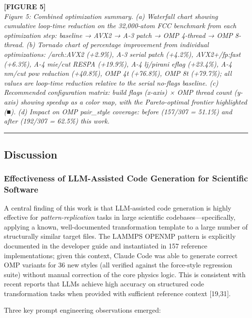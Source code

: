 \documentclass[
  11pt,
]{article}
\begin{document}
\textbf{{[}FIGURE 5{]}}\\
\emph{Figure 5: Combined optimization summary. (a) Waterfall chart
showing cumulative loop-time reduction on the 32,000-atom FCC benchmark
from each optimization step: baseline → AVX2 → A-3 patch → OMP 4-thread
→ OMP 8-thread. (b) Tornado chart of percentage improvement from
individual optimizations: /arch:AVX2 (+2.9\%), A-3 serial patch
(+4.2\%), AVX2+/fp:fast (+6.3\%), A-4 mie/cut RESPA (+19.9\%), A-4
lj/pirani eflag (+23.4\%), A-4 nm/cut pow reduction (+40.8\%), OMP 4t
(+76.8\%), OMP 8t (+79.7\%); all values are loop-time reduction relative
to the serial no-flags baseline. (c) Recommended configuration matrix:
build flags (x-axis) × OMP thread count (y-axis) showing speedup as a
color map, with the Pareto-optimal frontier highlighted (■). (d) Impact
on OMP pair\_style coverage: before (157/307 = 51.1\%) and after
(192/307 = 62.5\%) this work.}

\begin{center}\rule{0.5\linewidth}{0.5pt}\end{center}

\subsection{Discussion}\label{discussion}

\subsubsection{Effectiveness of LLM-Assisted Code Generation for
Scientific
Software}\label{effectiveness-of-llm-assisted-code-generation-for-scientific-software}

A central finding of this work is that LLM-assisted code generation is
highly effective for \emph{pattern-replication} tasks in large
scientific codebases---specifically, applying a known, well-documented
transformation template to a large number of structurally similar target
files. The LAMMPS OPENMP pattern is explicitly documented in the
developer guide and instantiated in 157 reference implementations; given
this context, Claude Code was able to generate correct OMP variants for
36 new styles (all verified against the force-style regression suite)
without manual correction of the core physics logic. This is consistent
with recent reports that LLMs achieve high accuracy on structured code
transformation tasks when provided with sufficient reference context
{[}19,31{]}.

Three key prompt engineering observations emerged:
\end{document}
